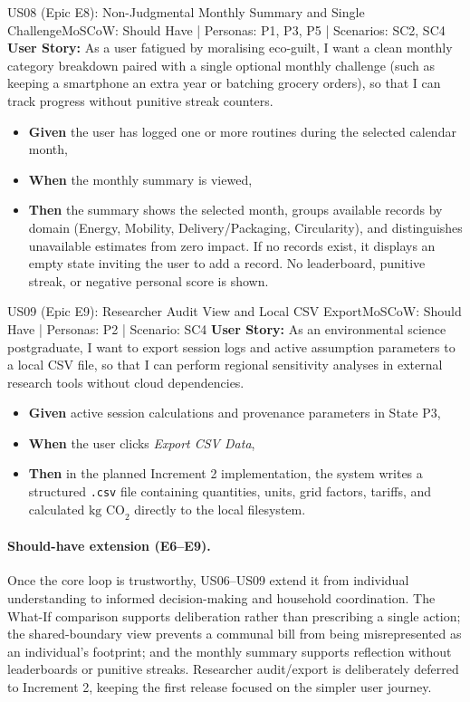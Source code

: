 \documentclass[12pt,a4paper]{article}
\begin{document}
\begin{storybox}{US08 (Epic E8): Non-Judgmental Monthly Summary and Single Challenge}{MoSCoW: Should Have | Personas: P1, P3, P5 | Scenarios: SC2, SC4}
\textbf{User Story:} As a user fatigued by moralising eco-guilt, I want a clean monthly category breakdown paired with a single optional monthly challenge (such as keeping a smartphone an extra year or batching grocery orders), so that I can track progress without punitive streak counters.
\begin{itemize}
    \item \textbf{Given} the user has logged one or more routines during the selected calendar month,
    \item \textbf{When} the monthly summary is viewed,
    \item \textbf{Then} the summary shows the selected month, groups available records by domain (Energy, Mobility, Delivery/Packaging, Circularity), and distinguishes unavailable estimates from zero impact. If no records exist, it displays an empty state inviting the user to add a record. No leaderboard, punitive streak, or negative personal score is shown.
\end{itemize}
\end{storybox}

\begin{storybox}{US09 (Epic E9): Researcher Audit View and Local CSV Export}{MoSCoW: Should Have | Personas: P2 | Scenario: SC4}
\textbf{User Story:} As an environmental science postgraduate, I want to export session logs and active assumption parameters to a local CSV file, so that I can perform regional sensitivity analyses in external research tools without cloud dependencies.
\begin{itemize}
    \item \textbf{Given} active session calculations and provenance parameters in State P3,
    \item \textbf{When} the user clicks \textit{Export CSV Data},
    \item \textbf{Then} in the planned Increment 2 implementation, the system writes a structured \texttt{.csv} file containing quantities, units, grid factors, tariffs, and calculated $\text{kg CO}_2$ directly to the local filesystem.
\end{itemize}
\end{storybox}

\paragraph{Should-have extension (E6--E9).}
Once the core loop is trustworthy, US06--US09 extend it from individual understanding to informed decision-making and household coordination. The What-If comparison supports deliberation rather than prescribing a single action; the shared-boundary view prevents a communal bill from being misrepresented as an individual's footprint; and the monthly summary supports reflection without leaderboards or punitive streaks. Researcher audit/export is deliberately deferred to Increment 2, keeping the first release focused on the simpler user journey.
\end{document}
